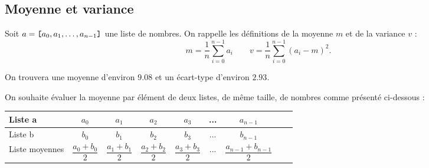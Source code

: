\subsection*{Moyenne et variance}

Soit $a=\verb![!a_0,a_1,\dots,a_{n-1}\verb!]!$ une liste de nombres. On rappelle les définitions de la moyenne $m$ et de la variance $v$ : 
$$m = \dfrac{1}{n} \sum_{i=0}^{n-1} a_i \qquad v = \dfrac{1}{n} \sum_{i=0}^{n-1} (a_i-m)^2.$$











\begin{rem}On trouvera une moyenne d'environ $9.08$ et un écart-type d'environ $2.93$.
  \end{rem}


On souhaite évaluer la moyenne par élément de deux listes, de même taille, de nombres comme présenté ci-dessous :

\begin{center}
\begin{tabular}{|l|c|c|c|c|c|c|c|c|}
\hline
Liste a & $a_0$ & $a_1$ & $a_2$ & $a_3$ & ...& $a_{n-1}$ \\ \hline
Liste b & $b_0$ & $b_1$ & $b_2$ & $b_3$ & ...& $b_{n-1}$ \\ \hline
Liste moyennes & $\dfrac{a_0+b_0}{2}$ & $\dfrac{a_1+b_1}{2}$ & $\dfrac{a_2+b_2}{2}$ & $\dfrac{a_3+b_3}{2}$ & ...& $\dfrac{a_{n-1}+b_{n-1}}{2}$ \\ \hline
\end{tabular}
\end{center}

